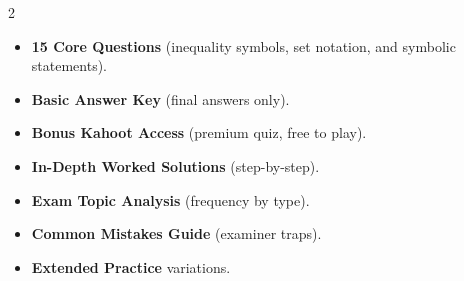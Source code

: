 \documentclass[11pt,a4paper]{article}
\newcommand{\FullReleaseDate}{April 30, 2026}
\begin{document}
\vspace{8pt}

\begin{multicols}{2}
  \begin{tcolorbox}[card, title=\sffamily\bfseries\textcolor{white}{\faHandPointDown\ TODAY (Simplified Version)}, colbacktitle=mainblue, boxed title style={sharp corners, boxrule=0pt}]
    \begin{itemize}[leftmargin=1.2em, itemsep=2pt]
      \item \small \textbf{15 Core Questions} (inequality symbols, set notation, and symbolic statements).
      \item \small \textbf{Basic Answer Key} (final answers only).
      \item \small \textbf{Bonus Kahoot Access} (premium quiz, free to play).
    \end{itemize}
  \end{tcolorbox}

  \columnbreak

  \begin{tcolorbox}[card, title=\sffamily\bfseries\textcolor{white}{\faRocket\ ON \FullReleaseDate\ (Full Upgrade)}, colbacktitle=mainblue, boxed title style={sharp corners, boxrule=0pt}]
    \begin{itemize}[leftmargin=1.2em, itemsep=2pt]
      \item \small \textbf{In-Depth Worked Solutions} (step-by-step).
      \item \small \textbf{Exam Topic Analysis} (frequency by type).
      \item \small \textbf{Common Mistakes Guide} (examiner traps).
      \item \small \textbf{Extended Practice} variations.
    \end{itemize}
  \end{tcolorbox}
\end{multicols}
\end{document}
